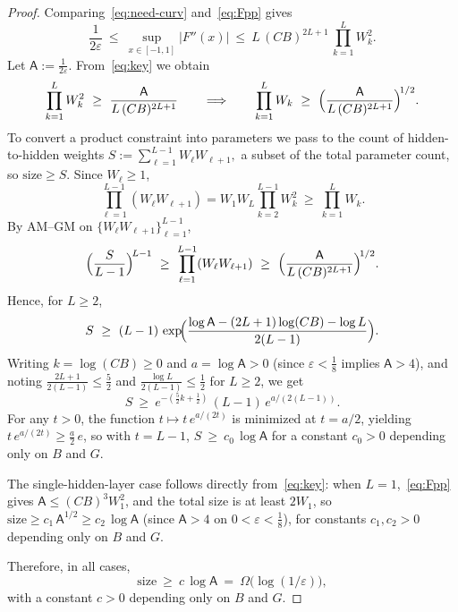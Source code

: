 \documentclass[10pt,a4paper]{amsart}
\begin{document}
\begin{proof}
Comparing~\cref{eq:need-curv} and~\cref{eq:Fpp} gives
\begin{equation}\label{eq:key}
\frac{1}{2\varepsilon}\ \le\ \sup_{x\in[-1,1]}|F''(x)|\ \le\ L\,(C B)^{2L+1}\,\prod_{k=1}^{L} W_k^{2}.
\end{equation}
Let $\mathsf{A}:=\tfrac{1}{2\varepsilon}$. From~\cref{eq:key} we obtain
\[
\prod_{k=1}^{L} W_k^{2}\ \ge\ \frac{\mathsf{A}}{L\,(C B)^{2L+1}}
\qquad\Longrightarrow\qquad
\prod_{k=1}^{L} W_k\ \ge\ \Bigl(\frac{\mathsf{A}}{L\,(C B)^{2L+1}}\Bigr)^{\!1/2}.
\]
To convert a product constraint into parameters we pass to the count of hidden-to-hidden weights \(
S:=\sum_{\ell=1}^{L-1} W_\ell W_{\ell+1},
\) a subset of the total parameter count, so $\mathrm{size}\ge S$. Since $W_\ell\ge1$,
\[
\prod_{\ell=1}^{L-1} (W_\ell W_{\ell+1})
= W_1 W_L \prod_{k=2}^{L-1} W_k^{2}
\ \ge\ \prod_{k=1}^{L} W_k.
\]
By AM--GM on $\{W_\ell W_{\ell+1}\}_{\ell=1}^{L-1}$,
\[
\Bigl(\frac{S}{L-1}\Bigr)^{\!L-1}\ \ge\ \prod_{\ell=1}^{L-1} (W_\ell W_{\ell+1})
\ \ge\ \Bigl(\frac{\mathsf{A}}{L\,(C B)^{2L+1}}\Bigr)^{\!1/2}.
\]
Hence, for $L\ge2$,
\[
S\ \ge\ (L-1)\,\exp\!\Bigl(\frac{\log \mathsf{A}-(2L+1)\log(CB)-\log L}{2(L-1)}\Bigr).
\]
Writing $k=\log(CB)\ge0$ and $a=\log \mathsf{A}>0$ (since $\varepsilon<\tfrac18$ implies $\mathsf{A}>4$), and noting $\tfrac{2L+1}{2(L-1)}\le \tfrac52$ and $\tfrac{\log L}{2(L-1)}\le \tfrac12$ for $L\ge2$, we get
\[
S\ \ge\ e^{-(\tfrac52 k+\tfrac12)}\,(L-1)\,e^{a/(2(L-1))}.
\]
For any $t>0$, the function $t\mapsto t\,e^{a/(2t)}$ is minimized at $t=a/2$, yielding $t\,e^{a/(2t)}\ge \tfrac{a}{2}\,e$, so with $t=L-1$, \(
S\ \ge\ c_0\,\log \mathsf{A}
\) for a constant $c_0>0$ depending only on $B$ and $G$.

The single-hidden-layer case follows directly from~\cref{eq:key}: when $L=1$,~\cref{eq:Fpp} gives $\mathsf{A}\le (C B)^3 W_1^2$, and the total size is at least $2W_1$, so $\mathrm{size}\ge c_1\,\mathsf{A}^{1/2}\ge c_2\,\log \mathsf{A}$ (since $\mathsf{A}>4$ on $0<\varepsilon<\tfrac18$), for constants $c_1,c_2>0$ depending only on $B$ and $G$.

Therefore, in all cases,
\[
\mathrm{size}\ \ge\ c\,\log \mathsf{A}\ =\ \Omega\bigl(\log(1/\varepsilon)\bigr),
\]
with a constant $c>0$ depending only on $B$ and $G$.
\end{proof}
\end{document}
